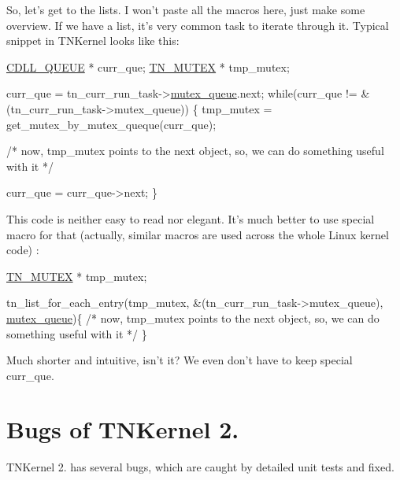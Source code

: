 So, let's get to the lists. I won't paste all the macros here, just make some overview. If we have a list, it's very common task to iterate through it. Typical snippet in T\+N\+Kernel looks like this\+:


\begin{DoxyCode}
\hyperlink{tn__oldsymbols_8h_aa16bdd3a176ccdb874207e4790a1aea4}{CDLL\_QUEUE} * curr\_que;
\hyperlink{structTN__Mutex}{TN\_MUTEX} * tmp\_mutex;

curr\_que = tn\_curr\_run\_task->\hyperlink{structTN__Mutex_a3d9a36e9441d047a4ec04878cf4ca2fd}{mutex\_queue}.next;
\textcolor{keywordflow}{while}(curr\_que != &(tn\_curr\_run\_task->mutex\_queue))
\{
   tmp\_mutex = get\_mutex\_by\_mutex\_queque(curr\_que);

   \textcolor{comment}{/* now, tmp\_mutex points to the next object, so,}
\textcolor{comment}{      we can do something useful with it */}

   curr\_que = curr\_que->next;
\}
\end{DoxyCode}


This code is neither easy to read nor elegant. It's much better to use special macro for that (actually, similar macros are used across the whole Linux kernel code) \+:


\begin{DoxyCode}
\hyperlink{structTN__Mutex}{TN\_MUTEX} * tmp\_mutex;

tn\_list\_for\_each\_entry(tmp\_mutex, &(tn\_curr\_run\_task->mutex\_queue), \hyperlink{structTN__Task_ad4decd7355c95a5b60a6774c3ee19eb9}{mutex\_queue})\{
   \textcolor{comment}{/* now, tmp\_mutex points to the next object, so,}
\textcolor{comment}{      we can do something useful with it */}
\}
\end{DoxyCode}


Much shorter and intuitive, isn't it? We even don't have to keep special {\ttfamily curr\+\_\+que}.\hypertarget{why_reimplement_why_reimplement__bugs}{}\section{Bugs of T\+N\+Kernel 2.}\label{why_reimplement_why_reimplement__bugs}
T\+N\+Kernel 2. has several bugs, which are caught by detailed unit tests and fixed.


